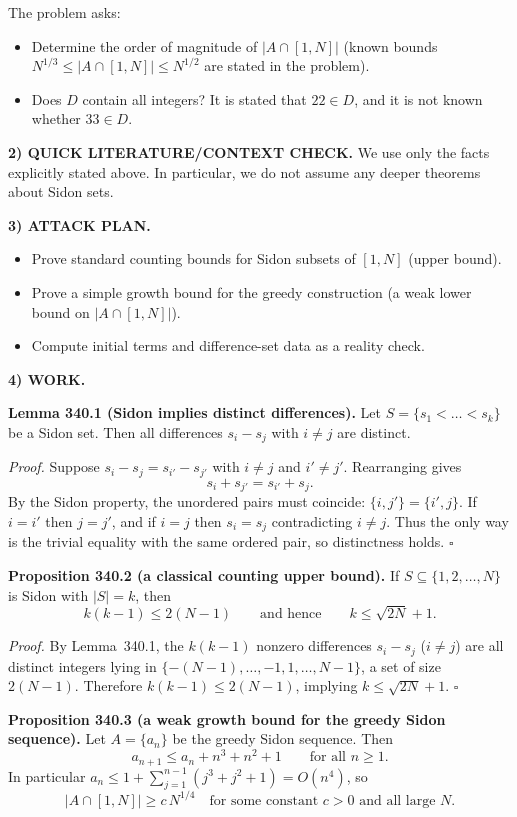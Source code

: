 The problem asks:
\begin{itemize}
\item Determine the order of magnitude of $|A\cap[1,N]|$ (known bounds $N^{1/3}\le |A\cap[1,N]|\le N^{1/2}$ are stated in the problem).
\item Does $D$ contain all integers? It is stated that $22\in D$, and it is not known whether $33\in D$.
\end{itemize}

\medskip
\noindent\textbf{2) QUICK LITERATURE/CONTEXT CHECK.}
We use only the facts explicitly stated above. In particular, we do not assume any deeper theorems about Sidon sets.

\medskip
\noindent\textbf{3) ATTACK PLAN.}
\begin{itemize}
\item Prove standard counting bounds for Sidon subsets of $[1,N]$ (upper bound).
\item Prove a simple growth bound for the greedy construction (a weak lower bound on $|A\cap[1,N]|$).
\item Compute initial terms and difference-set data as a reality check.
\end{itemize}

\medskip
\noindent\textbf{4) WORK.}

\medskip
\noindent\textbf{Lemma 340.1 (Sidon implies distinct differences).}
Let $S=\{s_1<\dots<s_k\}$ be a Sidon set. Then all differences $s_i-s_j$ with $i\ne j$ are distinct.

\noindent\emph{Proof.}
Suppose $s_i-s_j=s_{i'}-s_{j'}$ with $i\ne j$ and $i'\ne j'$. Rearranging gives
\[
 s_i+s_{j'} = s_{i'}+s_j.
\]
By the Sidon property, the unordered pairs must coincide: $\{i,j'\}=\{i',j\}$. If $i=i'$ then $j=j'$, and if $i=j$ then $s_i=s_j$ contradicting $i\ne j$. Thus the only way is the trivial equality with the same ordered pair, so distinctness holds.
\hfill$\square$

\medskip
\noindent\textbf{Proposition 340.2 (a classical counting upper bound).}
If $S\subseteq\{1,2,\dots,N\}$ is Sidon with $|S|=k$, then
\[
 k(k-1)\le 2(N-1)\qquad\text{and hence}\qquad k\le \sqrt{2N}+1.
\]

\noindent\emph{Proof.}
By Lemma~340.1, the $k(k-1)$ nonzero differences $s_i-s_j$ ($i\ne j$) are all distinct integers lying in $\{-(N-1),\dots,-1,1,\dots,N-1\}$, a set of size $2(N-1)$. Therefore $k(k-1)\le 2(N-1)$, implying $k\le \sqrt{2N}+1$.
\hfill$\square$

\medskip
\noindent\textbf{Proposition 340.3 (a weak growth bound for the greedy Sidon sequence).}
Let $A=\{a_n\}$ be the greedy Sidon sequence. Then
\[
 a_{n+1} \le a_n + n^3+n^2+1\qquad\text{for all }n\ge 1.
\]
In particular $a_n\le 1+\sum_{j=1}^{n-1}(j^3+j^2+1)=O(n^4)$, so
\[
|A\cap[1,N]|\ge c\,N^{1/4}\quad\text{for some constant }c>0\text{ and all large }N.
\]


